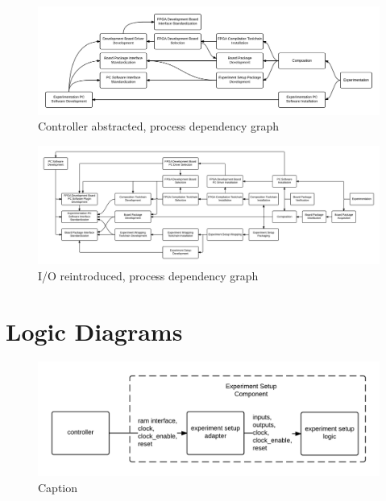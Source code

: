 \documentclass[openright]{uva-bachelor-thesis}
\begin{document}
\begin{landscape}
\begin{figure}
\centering
\includegraphics[width=\hsize]{processes-dependencies-abstract}
\caption{Controller abstracted, process dependency graph}
\label{fig:dependencies-abstract}
\end{figure}
\end{landscape}

\begin{landscape}
\begin{figure}
\centering
\includegraphics[width=\hsize]{processes-dependencies-io}
\caption{I/O reintroduced, process dependency graph}
\label{fig:dependencies-io}
\end{figure}
\end{landscape}

\chapter{Logic Diagrams}

\begin{figure}
    \centering
    \includegraphics[width=\textwidth]{logic-wrap-simple}
    \caption{Caption}
    \label{fig:logic-wrap-simple}
\end{figure}
\end{document}
